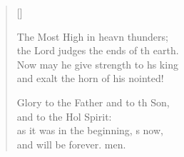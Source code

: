 \begin{verse}[\versewidth]
\begin{patverse}
The Most High in heavn thunders;\Med\\
the Lord judges the ends of th earth.\\
Now may he give strength to h\pointup{\i}s king\Med\\
and exalt the horn of his nointed!

Glory to the Father and to th Son,\Med\\
and to the Hol Spirit:\\
as it was in the beginning, \pointup{\i}s now,\Med\\
and will be forever. men.
  \end{patverse}
\end{verse}
